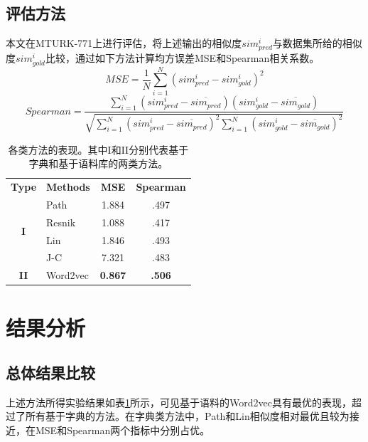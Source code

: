 \documentclass{article}
\begin{document}
\subsection{评估方法}
本文在MTURK-771上进行评估，将上述输出的相似度$sim_{pred}^i$与数据集所给的相似度$sim_{gold}^i$比较，通过如下方法计算均方误差MSE和Spearman相关系数。
\[ MSE = \frac{1}{N} \sum\limits_{i=1}^{N} {(sim_{pred}^i-sim_{gold}^i)}^2 \]
\[ Spearman = \frac{\sum\limits_{i=1}^N (sim_{pred}^i - \overline{sim_{pred}})(sim_{gold}^i - \overline{sim_{gold}})}{\sqrt{\sum\limits_{i=1}^N {(sim_{pred}^i - \overline{sim_{pred}})}^2  \sum\limits_{i=1}^N {(sim_{gold}^i - \overline{sim_{gold}})}^2}} \]


\begin{table}[h]
  \centering
  \begin{tabular}{c l c c}
    \toprule
    \bfseries Type & \bfseries Methods & \bfseries MSE & \bfseries Spearman\\
    \cmidrule(lr){1-4}
    \multirow{4}{*}{\bfseries I} &
    Path  & 1.884 & .497 \\
    & Resnik & 1.088 & .417 \\
    & Lin & 1.846 & .493 \\
    & J-C & 7.321 & .483 \\
    \cmidrule(lr){1-4}
    \multirow{1}{*}{\bfseries II} &
    Word2vec & \bfseries 0.867 & \bfseries .506 \\
    \bottomrule
\end{tabular}
  \caption{各类方法的表现。其中I和II分别代表基于字典和基于语料库的两类方法。}
  \label{tab:overall_eval}
\end{table}

\section{结果分析}
\subsection{总体结果比较}
上述方法所得实验结果如表\ref{tab:overall_eval}所示，可见基于语料的Word2vec具有最优的表现，超过了所有基于字典的方法。在字典类方法中，Path和Lin相似度相对最优且较为接近，在MSE和Spearman两个指标中分别占优。
\end{document}
